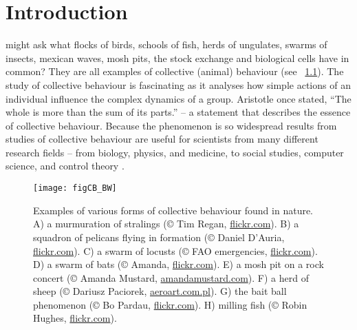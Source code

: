 









\chapter{Introduction}
\label{chap:introduction}


 might ask what flocks of birds, schools of fish, herds of ungulates, swarms of insects, mexican waves, mosh pits, the stock exchange and biological cells have in common? They are all examples of collective (animal) behaviour (see \figurename~\ref{fig:CB}). The study of collective behaviour is fascinating as it analyses how simple actions of an individual influence the complex dynamics of a group. Aristotle once stated, ``The whole is more than the sum of its parts.'' -- a statement that describes the essence of collective behaviour. Because the phenomenon is so widespread results from studies of collective behaviour are useful for scientists from many different research fields -- from biology, physics, and medicine, to social studies, computer science, and control theory \cite{deisboeck2009collective,lebarbajec2009organized,nahin2012chases,silverberg2013collective,spector2003emergence,sumpter2006principles,vicsek1995novel,wei2009pursuit,xu2014crowd}.

\begin{figure}[p]
	\texttt{[image: figCB\_BW]}
	\caption{Examples of various forms of collective behaviour found in nature. A) a murmuration of stralings (© Tim Regan, \href{http://www.flickr.com}{flickr.com}). B) a squadron of pelicans flying in formation (© Daniel D'Auria, \href{http://www.flickr.com}{flickr.com}). C) a swarm of locusts (© FAO emergencies, \href{http://www.flickr.com}{flickr.com}). D) a swarm of bats (© Amanda, \href{http://www.flickr.com}{flickr.com}). E) a mosh pit on a rock concert (© Amanda Mustard, \href{http://www.amandamustard.com/}{amandamustard.com}). F) a herd of sheep (© Dariusz Paciorek, \href{http://www.aeroart.com.pl/}{aeroart.com.pl}). G) the bait ball phenomenon (© Bo Pardau, \href{http://www.flickr.com}{flickr.com}). H) milling fish (© Robin Hughes, \href{http://www.flickr.com}{flickr.com}).}
	\label{fig:CB}
\end{figure}

